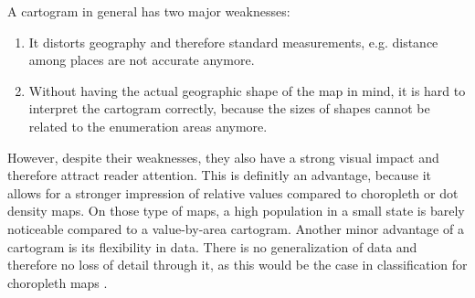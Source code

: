 A cartogram in general has two major weaknesses:
\begin{enumerate}
\item It distorts geography and therefore standard measurements, e.g. distance among places are not accurate anymore.
\item Without having the actual geographic shape of the map in mind, it is hard to interpret the cartogram correctly, because the sizes of shapes cannot be related to the enumeration areas anymore.
\end{enumerate}

However, despite their weaknesses, they also have a strong visual impact and therefore attract reader attention. This is definitly an advantage, because it allows for a stronger impression of relative values compared to choropleth or dot density maps. On those type of maps, a high population in a small state is barely noticeable compared to a value-by-area cartogram.
Another minor advantage of a cartogram is its flexibility in data. There is no generalization of data and therefore no loss of detail through it, as this would be the case in classification for choropleth maps .
